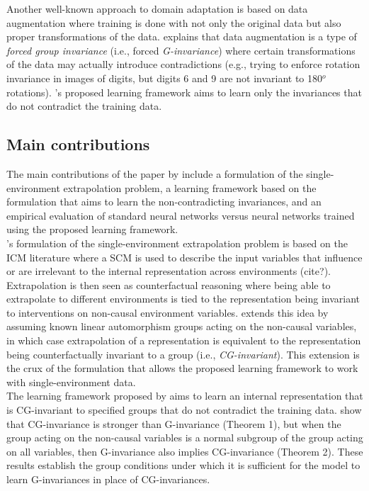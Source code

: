 Another well-known approach to domain adaptation is based on data augmentation \parencite{Chen:2020} where training is done with not only the original data but also proper transformations of the data. \citeauthor{Mouli:2021} explains that data augmentation is a type of \textit{forced group invariance} (i.e., forced \textit{G-invariance}) where certain transformations of the data may actually introduce contradictions (e.g., trying to enforce rotation invariance in images of digits, but digits 6 and 9 are not invariant to 180$^o$ rotations). \citeauthor{Mouli:2021}'s proposed learning framework aims to learn only the invariances that do not contradict the training data.


\subsection{Main contributions}

The main contributions of the paper by \textcite{Mouli:2021} include a formulation of the single-environment extrapolation problem, a learning framework based on the formulation that aims to learn the non-contradicting invariances, and an empirical evaluation of standard neural networks versus neural networks trained using the proposed learning framework.
\\

\citeauthor{Mouli:2021}'s formulation of the single-environment extrapolation problem is based on the ICM literature where a SCM is used to describe the input variables that influence or are irrelevant to the internal representation across environments (\todo cite?). Extrapolation is then seen as counterfactual reasoning where being able to extrapolate to different environments is tied to the representation being invariant to interventions on non-causal environment variables. \citeauthor{Mouli:2021} extends this idea by assuming known linear automorphism groups acting on the non-causal variables, in which case extrapolation of a representation is equivalent to the representation being counterfactually invariant to a group (i.e., \textit{CG-invariant}). This extension is the crux of the formulation that allows the proposed learning framework to work with single-environment data.
\\

The learning framework proposed by \citeauthor{Mouli:2021} aims to learn an internal representation that is CG-invariant to specified groups that do not contradict the training data. \citeauthor{Mouli:2021} show that CG-invariance is stronger than G-invariance (Theorem 1), but when the group acting on the non-causal variables is a normal subgroup of the group acting on all variables, then G-invariance also implies CG-invariance (Theorem 2). These results establish the group conditions under which it is sufficient for the model to learn G-invariances in place of CG-invariances.
\\


